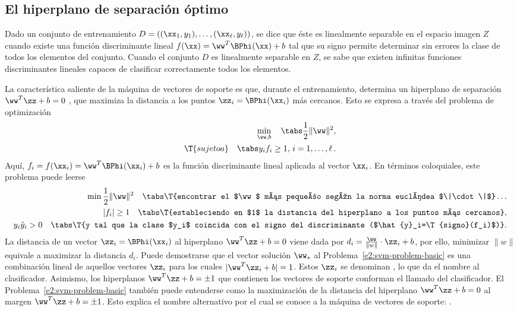 %
%
\subsection{El hiperplano de separación óptimo}
%
Dado un conjunto de entrenamiento
$D=\left((\xx_1,y_1),\ldots,(\xx_\ell,y_\ell)\right)$, se dice que
éste es linealmente separable en el espacio imagen $Z$ cuando existe
una función discriminante lineal $f(\xx)=\ww^T\BPhi(\xx)+b$ tal que su
signo permite determinar sin errores la clase de todos los elementos
del conjunto. Cuando el conjunto $D$ es linealmente separable en $Z$,
se sabe que existen infinitas funciones discriminantes lineales
capaces de clasificar correctamente todos los elementos.

La característica saliente de la máquina de vectores de soporte es
que, durante el entrenamiento, determina un hiperplano de separación
$\ww^T\zz+b=0$ , que maximiza la distancia a los puntos
$\zz_i=\BPhi(\xx_i)$ más cercanos. Esto se expresa a través del
problema de optimización
%
\begin{equation}\label{e2:svm-problem-basic}
  \begin{aligned}
    \min_{\ww,b} \quad\tabs \frac{1}{2}\|\ww\|^2, \\
    \T{sujeto a}\quad\tabs y_i f_i\geq1,\,i=1,\ldots,\ell\,.
  \end{aligned}
\end{equation}
%
Aquí, $f_i=f(\xx_i)=\ww^T\BPhi(\xx_i)+b$ es la función discriminante
lineal aplicada al vector $\xx_i$. En términos coloquiales, este
problema puede leerse
%
\begin{align*}
  \min \frac{1}{2}\|\ww\|^2 \quad \tabs \T{encontrar el $\ww$ más
    pequeño según la norma euclídea $\|\cdot\|$}\ldots\\
  |f_i|\geq1 \quad \tabs \T{estableciendo en $1$ la distancia del
    hiperplano a los puntos más cercanos},\\
  y_i\hat{y}_i>0\quad \tabs \T{y tal que la clase $y_i$ coincida con el
    signo del discriminante ($\hat{y}_i=\T{signo}(f_i)$)}.
\end{align*}
%
La distancia de un vector $\zz_i=\BPhi(\xx_i)$ al hiperplano
$\ww^T\zz+b=0$ viene dada por $d_i=\frac{\ww}{\|w\|}\cdot\zz_i+b$, por
ello, minimizar $\|w\|$ equivale a maximizar la distancia $d_i$.
Puede demostrarse que el vector solución $\ww_*$ al
Problema~\ref{e2:svm-problem-basic} es una combinación lineal de
aquellos vectores $\zz_i$ para los cuales $|\ww^T\zz_i+b|=1$. Estos
$\zz_i$ se denominan , lo que da el nombre al
clasificador.
Asimismo, los hiperplanos $\ww^T\zz+b=\pm1$ que contienen los vectores
de soporte conforman el llamado  del clasificador.
El Problema~\ref{e2:svm-problem-basic} también puede entenderse como
la maximización de la distancia del hiperplano $\ww^T\zz+b=0$ al
margen $\ww^T\zz+b=\pm1$.
Esto explica el nombre alternativo por el cual se conoce a la máquina
de vectores de soporte: .

